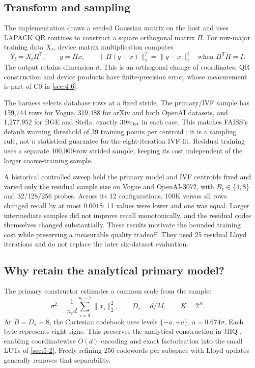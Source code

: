 \subsection{Transform and sampling}

The implementation draws a seeded Gaussian matrix on the host and uses
LAPACK QR routines to construct a square orthogonal matrix $\Pi$.
For row-major training data $X_t$, device matrix multiplication computes
\begin{equation}
 Y_t=X_t\Pi^{\mathsf T},\qquad y=\Pi x,\qquad
 \|\Pi(q-x)\|_2^2=\|q-x\|_2^2
 \quad\text{when }\Pi^{\mathsf T}\Pi=I.
 \label{eq:4-transform}
\end{equation}
The output retains dimension $d$. This is an orthogonal change of
coordinates; QR construction and device products have finite-precision
error, whose measurement is part of C0 in \cref{sec:4-6}.

The harness selects database rows at a fixed stride. The primary/IVF
sample has 159,744 rows for Vogue, 319,488 for arXiv and both OpenAI
datasets, and 1,277,952 for BGE and Stella: exactly $39n_{\rm list}$ in
each case. This matches FAISS's default warning threshold of 39 training
points per centroid \cite{faiss_clustering}; it is a sampling rule, not a
statistical guarantee for the eight-iteration IVF fit. Residual training
uses a separate 100,000-row strided sample, keeping its cost independent
of the larger coarse-training sample.

A historical controlled sweep held the primary model and IVF centroids
fixed and varied only the residual sample size on Vogue and OpenAI-3072,
with $B_r\in\{4,8\}$ and 32/128/256 probes. Across its 12 configurations,
100K versus all rows changed recall by at most $0.0018$: 11 values were
lower and one was equal. Larger intermediate samples did not improve
recall monotonically, and the residual codes themselves changed
substantially. These results motivate the bounded training cost while
preserving a measurable quality tradeoff. They used 25 residual Lloyd
iterations and do not replace the later six-dataset evaluation.

\subsection{Why retain the analytical primary model?}

The primary constructor estimates a common scale from the sample:
\begin{equation}
 \sigma^2=\frac{1}{n_t d}\sum_{i=0}^{n_t-1}\|x_i\|_2^2,
 \qquad D_s=d/M,\qquad K=2^B.
 \label{eq:4-scale}
\end{equation}
At $B=D_s=8$, the Cartesian codebook uses levels $\{-a,+a\}$,
$a=0.674\sigma$. Each byte represents eight signs. This preserves the
analytical construction in JHQ \cite{jhq}, enabling coordinatewise
$O(d)$ encoding and exact factorisation into the small LUTs of
\cref{sec:5-2}. Freely refining 256 codewords per subspace with Lloyd
updates generally removes that separability.

